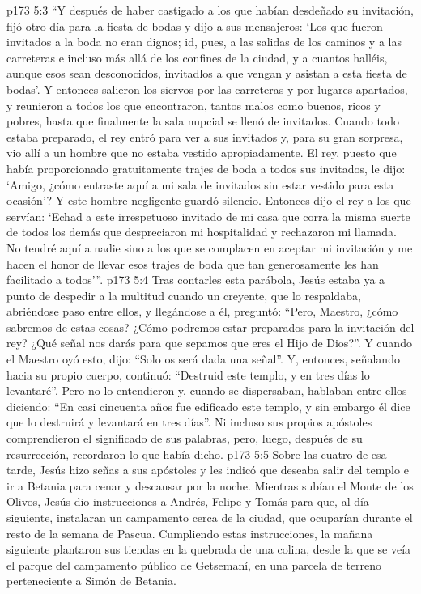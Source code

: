 \vs p173 5:3 “Y después de haber castigado a los que habían desdeñado su invitación, fijó otro día para la fiesta de bodas y dijo a sus mensajeros: ‘Los que fueron invitados a la boda no eran dignos; id, pues, a las salidas de los caminos y a las carreteras e incluso más allá de los confines de la ciudad, y a cuantos halléis, aunque esos sean desconocidos, invitadlos a que vengan y asistan a esta fiesta de bodas’. Y entonces salieron los siervos por las carreteras y por lugares apartados, y reunieron a todos los que encontraron, tantos malos como buenos, ricos y pobres, hasta que finalmente la sala nupcial se llenó de invitados. Cuando todo estaba preparado, el rey entró para ver a sus invitados y, para su gran sorpresa, vio allí a un hombre que no estaba vestido apropiadamente. El rey, puesto que había proporcionado gratuitamente trajes de boda a todos sus invitados, le dijo: ‘Amigo, ¿cómo entraste aquí a mi sala de invitados sin estar vestido para esta ocasión’? Y este hombre negligente guardó silencio. Entonces dijo el rey a los que servían: ‘Echad a este irrespetuoso invitado de mi casa que corra la misma suerte de todos los demás que despreciaron mi hospitalidad y rechazaron mi llamada. No tendré aquí a nadie sino a los que se complacen en aceptar mi invitación y me hacen el honor de llevar esos trajes de boda que tan generosamente les han facilitado a todos’”.
\vs p173 5:4 \pc Tras contarles esta parábola, Jesús estaba ya a punto de despedir a la multitud cuando un creyente, que lo respaldaba, abriéndose paso entre ellos, y llegándose a él, preguntó: “Pero, Maestro, ¿cómo sabremos de estas cosas? ¿Cómo podremos estar preparados para la invitación del rey? ¿Qué señal nos darás para que sepamos que eres el Hijo de Dios?”. Y cuando el Maestro oyó esto, dijo: “Solo os será dada una señal”. Y, entonces, señalando hacia su propio cuerpo, continuó: “Destruid este templo, y en tres días lo levantaré”. Pero no lo entendieron y, cuando se dispersaban, hablaban entre ellos diciendo: “En casi cincuenta años fue edificado este templo, y sin embargo él dice que lo destruirá y levantará en tres días”. Ni incluso sus propios apóstoles comprendieron el significado de sus palabras, pero, luego, después de su resurrección, recordaron lo que había dicho.
\vs p173 5:5 Sobre las cuatro de esa tarde, Jesús hizo señas a sus apóstoles y les indicó que deseaba salir del templo e ir a Betania para cenar y descansar por la noche. Mientras subían el Monte de los Olivos, Jesús dio instrucciones a Andrés, Felipe y Tomás para que, al día siguiente, instalaran un campamento cerca de la ciudad, que ocuparían durante el resto de la semana de Pascua. Cumpliendo estas instrucciones, la mañana siguiente plantaron sus tiendas en la quebrada de una colina, desde la que se veía el parque del campamento público de Getsemaní, en una parcela de terreno perteneciente a Simón de Betania.
